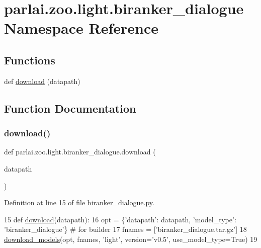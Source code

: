 \hypertarget{namespaceparlai_1_1zoo_1_1light_1_1biranker__dialogue}{}\section{parlai.\+zoo.\+light.\+biranker\+\_\+dialogue Namespace Reference}
\label{namespaceparlai_1_1zoo_1_1light_1_1biranker__dialogue}
\subsection*{Functions}
\begin{DoxyCompactItemize}
\item 
def \hyperlink{namespaceparlai_1_1zoo_1_1light_1_1biranker__dialogue_a05cb4ae259c43c98f9def9a34b97316a}{download} (datapath)
\end{DoxyCompactItemize}


\subsection{Function Documentation}
\mbox{\label{namespaceparlai_1_1zoo_1_1light_1_1biranker__dialogue_a05cb4ae259c43c98f9def9a34b97316a}} 
\subsubsection{\texorpdfstring{download()}{download()}}
{\footnotesize\ttfamily def parlai.\+zoo.\+light.\+biranker\+\_\+dialogue.\+download (\begin{DoxyParamCaption}\item[{}]{datapath }\end{DoxyParamCaption})}



Definition at line 15 of file biranker\+\_\+dialogue.\+py.


\begin{DoxyCode}
15 \textcolor{keyword}{def }\hyperlink{namespaceparlai_1_1zoo_1_1light_1_1biranker__dialogue_a05cb4ae259c43c98f9def9a34b97316a}{download}(datapath):
16     opt = \{\textcolor{stringliteral}{'datapath'}: datapath, \textcolor{stringliteral}{'model\_type'}: \textcolor{stringliteral}{'biranker\_dialogue'}\}  \textcolor{comment}{# for builder}
17     fnames = [\textcolor{stringliteral}{'biranker\_dialogue.tar.gz'}]
18     \hyperlink{namespaceparlai_1_1core_1_1build__data_ab697f23f05d3e36d7979fe5e0ed7911e}{download\_models}(opt, fnames, \textcolor{stringliteral}{'light'}, version=\textcolor{stringliteral}{'v0.5'}, use\_model\_type=\textcolor{keyword}{True})
19 \end{DoxyCode}

